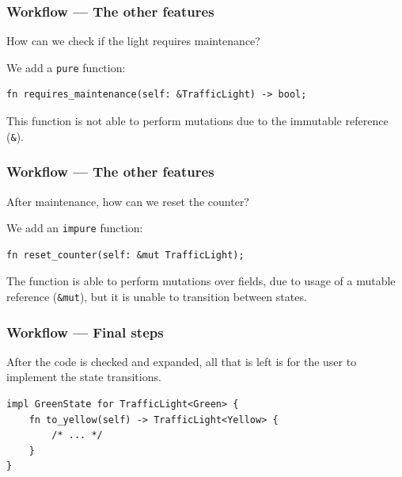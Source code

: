\documentclass[bigger,notes,aspectratio=169]{beamer}
\begin{document}
\begin{frame}[fragile]
    \frametitle{Workflow --- The other features}
    How can we check if the light requires maintenance?

    We add a \texttt{pure} function:
    \begin{listing}
        \centering
        \begin{verbatim}
fn requires_maintenance(self: &TrafficLight) -> bool;
        \end{verbatim}
    \end{listing}
    This function is not able to perform mutations due to the immutable reference (\texttt{\&}).

\end{frame}

\begin{frame}[fragile]
    \frametitle{Workflow --- The other features}
    After maintenance, how can we reset the counter?

    We add an \texttt{impure} function:
    \begin{listing}
        \centering
        \begin{verbatim}
fn reset_counter(self: &mut TrafficLight);
        \end{verbatim}
    \end{listing}
    The function is able to perform mutations over fields, due to usage of a mutable reference (\texttt{\&mut}),
    but it is unable to transition between states.

\end{frame}

\begin{frame}[fragile]
    \frametitle{Workflow --- Final steps}
    After the code is checked and expanded, all that is left is for the user to implement the state transitions.
    \begin{listing}
        \centering
        \begin{verbatim}
impl GreenState for TrafficLight<Green> {
    fn to_yellow(self) -> TrafficLight<Yellow> {
        /* ... */
    }
}
        \end{verbatim}
    \end{listing}

\end{frame}
\end{document}
